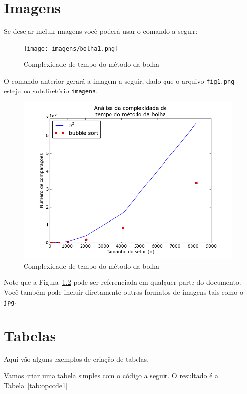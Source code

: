 \documentclass[12pt,a4paper,twoside]{report}
\begin{document}
\chapter{Imagens}

Se desejar incluir imagens você poderá usar o comando a seguir:

\begin{latex}
\begin{figure}[!ht]
\centering
\texttt{[image: imagens/bolha1.png]}
\caption{Complexidade de tempo do método da bolha \label{fig:1}}
\end{figure}
\end{latex}

O comando anterior gerará a imagem a seguir, dado que o arquivo \texttt{fig1.png} esteja no subdiretório \texttt{imagens}.
\begin{figure}[!h]
\centering
\includegraphics[scale=0.5]{../imagens/Bubble/bubble_plot_1.png}
\caption{Complexidade de tempo do método da bolha \label{fig:1}}
\end{figure}

Note que a Figura~\ref{fig:1} pode ser referenciada em qualquer parte do documento.  Você também pode incluir diretamente outros formatos de imagens tais como o \texttt{jpg}.

\chapter{Tabelas}

Aqui vão alguns exemplos de criação de tabelas.

Vamos criar uma tabela simples com o código a seguir. O resultado é a 
Tabela~\ref{tab:opcode1}
\end{document}
